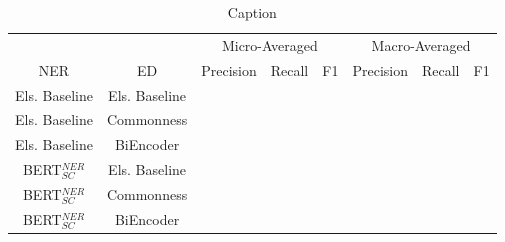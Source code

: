 \documentclass{report}
\theoremstyle{definition}
\theoremstyle{remark}
\begin{document}
\begin{table}[h!]
    \centering
    \begin{tabular}{cc|ccc|ccc}
    &&\multicolumn{3}{c|}{Micro-Averaged}&\multicolumn{3}{c}{Macro-Averaged}\\
    NER & ED  & Precision & Recall & F1 & Precision & Recall & F1   \\
    \hline
    Els. Baseline & Els. Baseline     & &&&&&\\[0.7ex]
    Els. Baseline & Commonness        &&&&&&\\[0.7ex]
    Els. Baseline & BiEncoder         &&&&&&\\[0.7ex]
    BERT$_{SC}^{NER}$ & Els. Baseline     & &&&&&\\[0.7ex]
    BERT$_{SC}^{NER}$ & Commonness        &&&&&&\\[0.7ex]
    BERT$_{SC}^{NER}$ & BiEncoder         &&&&&&\\[0.7ex]
    \end{tabular}
    \caption{Caption}
    \label{tab:my_label}
\end{table}
\end{document}
